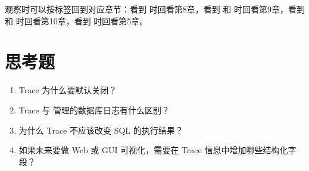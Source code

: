 观察时可以按标签回到对应章节：看到  时回看第8章，看到  和  时回看第9章，看到  和  时回看第10章，看到  时回看第5章。

\section{思考题}
\label{sec:trace-questions}

\begin{enumerate}
  \item Trace 为什么要默认关闭？
  \item Trace 与  管理的数据库日志有什么区别？
  \item 为什么 Trace 不应该改变 SQL 的执行结果？
  \item 如果未来要做 Web 或 GUI 可视化，需要在 Trace 信息中增加哪些结构化字段？
\end{enumerate}
